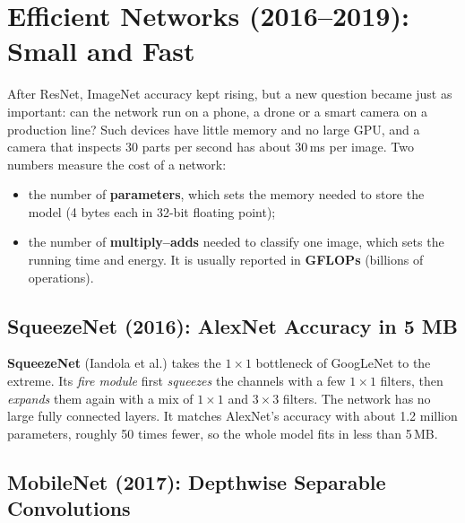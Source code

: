 \documentclass[12pt, a4paper]{article}
\begin{document}
\section{Efficient Networks (2016--2019): Small and Fast}

After ResNet, ImageNet accuracy kept rising, but a new question became just
as important: can the network run on a phone, a drone or a smart camera on a
production line? Such devices have little memory and no large GPU, and a
camera that inspects 30 parts per second has about 30\,ms per image. Two
numbers measure the cost of a network:
\begin{itemize}[nosep]
  \item the number of \textbf{parameters}, which sets the memory needed to
        store the model (4 bytes each in 32-bit floating point);
  \item the number of \textbf{multiply--adds} needed to classify one image,
        which sets the running time and energy. It is usually reported in
        \textbf{GFLOPs} (billions of operations).
\end{itemize}

\subsection{SqueezeNet (2016): AlexNet Accuracy in 5 MB}

\textbf{SqueezeNet} (Iandola et al.) takes the $1\times1$ bottleneck of
GoogLeNet to the extreme. Its \emph{fire module} first \emph{squeezes} the
channels with a few $1\times1$ filters, then \emph{expands} them again with a
mix of $1\times1$ and $3\times3$ filters. The network has no large fully
connected layers. It matches AlexNet's accuracy with about 1.2 million
parameters, roughly 50 times fewer, so the whole model fits in less than
5\,MB.

\subsection{MobileNet (2017): Depthwise Separable Convolutions}
\end{document}
